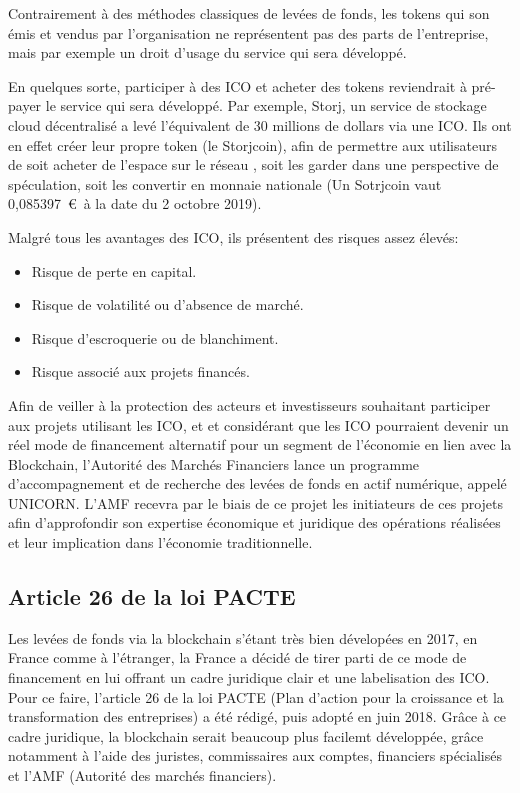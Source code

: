 \documentclass[12pt, a4paper, oneside]{book}
\begin{document}
    Contrairement à des méthodes classiques de levées de fonds, les tokens qui son émis et vendus par l'organisation ne représentent pas des parts
    de l'entreprise, mais par exemple un droit d'usage du service qui sera développé.

    En quelques sorte, participer à des ICO et acheter des tokens reviendrait à pré-payer le service qui sera développé.
    Par exemple, Storj, un service de stockage cloud décentralisé a levé l'équivalent de 30 millions de dollars via une ICO. 
    Ils ont en effet créer leur propre token (le Storjcoin), afin de permettre aux utilisateurs de soit acheter de l'espace sur le réseau , soit les garder dans 
    une perspective de spéculation, soit les convertir en monnaie nationale (Un Sotrjcoin vaut 0,085397~\euro~à la date du 2 octobre 2019).

    Malgré tous les avantages des ICO, ils présentent des risques assez élevés:
    \begin{itemize}
        \item Risque de perte en capital.
        \item Risque de volatilité ou d'absence de marché.
        \item Risque d'escroquerie ou de blanchiment.
        \item Risque associé aux projets financés.
    \end{itemize}

    Afin de veiller à la protection des acteurs et investisseurs souhaitant participer
    aux projets utilisant les ICO, et et considérant que les ICO pourraient devenir un réel mode de financement alternatif
    pour un segment de l'économie en lien avec la Blockchain, l'Autorité des Marchés Financiers
    lance un programme d'accompagnement et de recherche des levées de fonds en actif numérique, appelé UNICORN.
    L'AMF recevra par le biais de ce projet les initiateurs de ces projets afin d'approfondir son expertise économique et juridique
    des opérations réalisées et leur implication dans l'économie traditionnelle.
    
    \subsection{Article 26 de la loi PACTE}

    Les levées de fonds via la blockchain s'étant très bien dévelopées en 2017, en France comme à l'étranger, 
    la France a décidé de tirer parti de ce mode de financement en lui offrant un cadre juridique clair et une labelisation des ICO.
    Pour ce faire, l'article 26 de la loi PACTE (Plan d'action pour la croissance et la transformation des entreprises) a été rédigé, puis adopté en juin 2018. 
    Grâce à ce cadre juridique, la blockchain serait beaucoup plus facilemt développée, grâce notamment à l'aide des juristes, commissaires aux comptes, 
    financiers spécialisés et l'AMF (Autorité des marchés financiers).
    \cite{art26ico}
\end{document}
